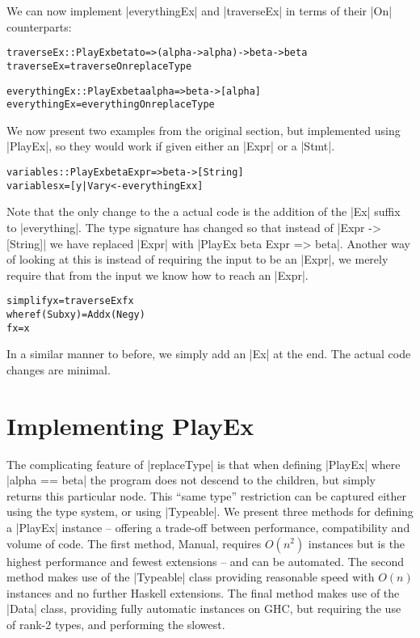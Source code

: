 \documentclass[preprint]{sigplanconf}
\newenvironment{code}{\begin{alltt}\small}{\end{alltt}}
\begin{document}
We can now implement |everythingEx| and |traverseEx| in terms of their |On| counterparts:

\begin{code}
traverseEx :: PlayEx beta to => (alpha -> alpha) -> beta -> beta
traverseEx = traverseOn replaceType

everythingEx :: PlayEx beta alpha => beta -> [alpha]
everythingEx = everythingOn replaceType
\end{code}

We now present two examples from the original section, but implemented using |PlayEx|, so they would work if given either an |Expr| or a |Stmt|.

\begin{code}
variables :: PlayEx beta Expr => beta -> [String]
variables x = [y | Var y <- everythingEx x]
\end{code}

Note that the only change to the a actual code is the addition of the |Ex| suffix to |everything|. The type signature has changed so that instead of |Expr -> [String]| we have replaced |Expr| with |PlayEx beta Expr => beta|. Another way of looking at this is instead of requiring the input to be an |Expr|, we merely require that from the input we know how to reach an |Expr|.

\begin{code}
simplify x = traverseEx f x
    where  f (Sub x y)  = Add x (Neg y)
           f x          = x
\end{code}

In a similar manner to before, we simply add an |Ex| at the end. The actual code changes are minimal.

\section{Implementing PlayEx}

The complicating feature of |replaceType| is that when defining |PlayEx| where |alpha == beta| the program does not descend to the children, but simply returns this particular node. This ``same type'' restriction can be captured either using the type system, or using |Typeable|. We present three methods for defining a |PlayEx| instance -- offering a trade-off between performance, compatibility and volume of code. The first method, Manual, requires $O(n^2)$ instances but is the highest performance and fewest extensions -- and can be automated. The second method makes use of the |Typeable| class providing reasonable speed with $O(n)$ instances and no further Haskell extensions. The final method makes use of the |Data| class, providing fully automatic instances on GHC, but requiring the use of rank-2 types, and performing the slowest.
\end{document}
